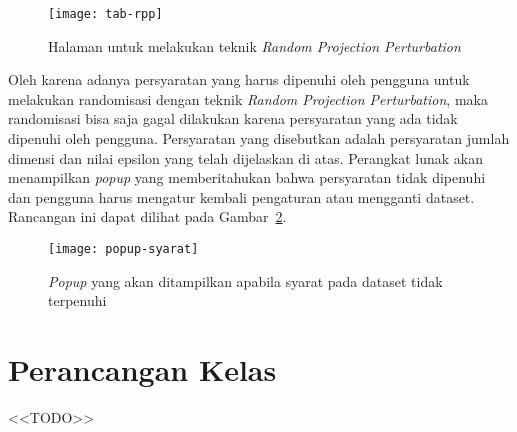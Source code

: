 \begin{figure}
	\centering
	\texttt{[image: tab-rpp]}
	\caption{Halaman untuk melakukan teknik \textit{Random Projection Perturbation}}
	\label{fig:tab-rpp}
\end{figure}

Oleh karena adanya persyaratan yang harus dipenuhi oleh pengguna untuk melakukan randomisasi dengan teknik \textit{Random Projection Perturbation}, maka randomisasi bisa saja gagal dilakukan karena persyaratan yang ada tidak dipenuhi oleh pengguna. Persyaratan yang disebutkan adalah persyaratan jumlah dimensi dan nilai epsilon yang telah dijelaskan di atas. Perangkat lunak akan menampilkan \textit{popup} yang memberitahukan bahwa persyaratan tidak dipenuhi dan pengguna harus mengatur kembali pengaturan atau mengganti dataset. Rancangan ini dapat dilihat pada Gambar~\ref{fig:popup-syarat}.

\begin{figure}
	\centering
	\texttt{[image: popup-syarat]}
	\caption{\textit{Popup} yang akan ditampilkan apabila syarat pada dataset tidak terpenuhi}
	\label{fig:popup-syarat}
\end{figure}

\section{Perancangan Kelas}
\label{sec:kelas}

<<TODO>>
